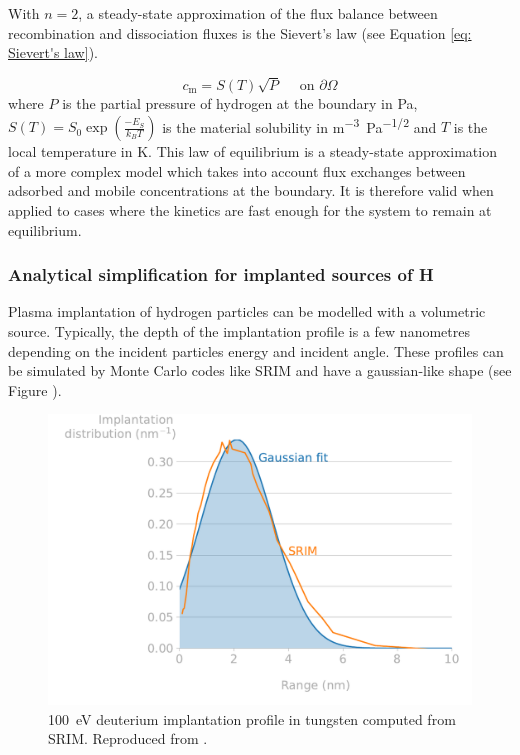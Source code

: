 With $n=2$, a steady-state approximation of the flux balance between recombination and dissociation fluxes is the Sievert's law (see Equation \ref{eq: Sievert's law}).

\begin{equation}
    c_\mathrm{m} = S(T) \sqrt{P}\quad \text { on } \partial \Omega
    \label{eq: Sievert's law}
\end{equation}
where $P$ is the partial pressure of hydrogen at the boundary in \si{Pa}, $S(T)=S_0 \exp(\frac{-E_S}{k_B T})$ is the material solubility in \si{m^{-3}.Pa^{-1/2}} and $T$ is the local temperature in \si{K}.
This law of equilibrium is a steady-state approximation of a more complex model which takes into account flux exchanges between adsorbed and mobile concentrations at the boundary.
It is therefore valid when applied to cases where the kinetics are fast enough for the system to remain at equilibrium.

\subsubsection{Analytical simplification for implanted sources of H} \label{triangle model}

Plasma implantation of hydrogen particles can be modelled with a volumetric source.
Typically, the depth of the implantation profile is a few nanometres depending on the incident particles energy and incident angle.
These profiles can be simulated by Monte Carlo codes like SRIM  and have a gaussian-like shape  (see Figure ).

\begin{figure}
    \centering
    \includegraphics[width=\linewidth]{Figures/Chapter1/srim_implantation_range.pdf}
    \caption{\SI{100}{eV} deuterium implantation profile in tungsten computed from SRIM. Reproduced from \cite{shimada_improved_2019}.}
\end{figure}

